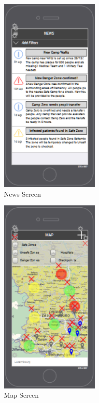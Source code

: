 \begin{figure}[htbp]
\begin{center}
 \caption{\label{fig:A6} News Screen}
   \includegraphics[width=50mm]{./images/App/newsscreen.eps}
\end{center}
\end{figure} 
\begin{figure}[htbp]
\begin{center}
 \caption{\label{fig:A7} Map Screen}
   \includegraphics[width=50mm]{./images/App/mapscreen.eps}
\end{center}
\end{figure} 
